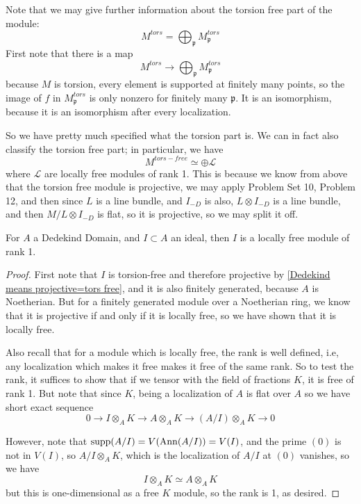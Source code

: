 Note that we may give further information about the torsion free part of the module:
\[M^{tors}=\bigoplus_{\mathfrak{p}} M_{\mathfrak{p}}^{tors}\]
First note that there is a map
\[M^{tors} \to \bigoplus_{\mathfrak{p}} M_{\mathfrak{p}}^{tors}\]
because $M$ is torsion, every element is supported at finitely many points, so the image of $f$ in $M^{tors}_\mathfrak{p}$ is only nonzero for finitely many $\mathfrak{p}$.
It is an isomorphism, because it is an isomorphism after every localization.

So we have pretty much specified what the torsion part is. We can in fact also classify the torsion free part;  in particular, we have
\[M^{tors-free} \simeq \oplus \mathcal{L}\]
where $\mathcal{L}$ are locally free modules of rank 1.
This is because we know from above that the torsion free module is projective, we may apply Problem Set 10, Problem 12, and then since $L$ is a line bundle, and $I_{-D}$ is also, $L \otimes I_{-D}$ is a line bundle, and then $M/L \otimes I_{-D}$ is flat, so it is projective, so we may split it off.



\begin{lemma} For $A$ a Dedekind Domain, and $I \subset A$ an ideal, then $I$ is a locally free module of rank 1.
\end{lemma}
\begin{proof}
First note that $I$ is torsion-free and therefore projective by \ref{Dedekind means projective=tors free}, and it is also finitely generated, because $A$ is Noetherian. But for a finitely generated module over a Noetherian ring, we know that it is projective if and only if it is locally free, so we have shown that it is locally free.

Also recall that for a module which is locally free, the rank is well defined,
i.e, any localization which makes it free makes it free of the same rank. So
to test the rank, it suffices to show that if we tensor with the field of
fractions $K$, it is free of rank 1. But note that since $K$, being a localization of $A$ is flat over $A$ so we have short exact sequence
\[0 \to I \otimes_A K \to A \otimes_A K \to (A/I) \otimes_A K \to 0\]

However, note that $\operatorname{supp}(A/I)=V(\operatorname{Ann}(A/I))=V(I)$, and the prime $(0)$ is not
in $V(I)$, so $A/I \otimes_{A} K$, which is the localization of $A/I$ at $(0)$ vanishes, so we have
\[I\otimes_A K \simeq A\otimes_A K\]
but this is one-dimensional as a free $K$ module, so the rank is 1, as desired.
\end{proof}

